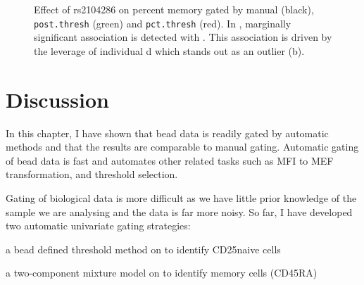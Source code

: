 \begin{figure}[h]
\begin{subfigure}[b]{.5\textwidth}
    \caption{}
\end{subfigure}
{Effect of rs2104286 on percent memory gated by manual (black), \texttt{post.thresh} (green) and \texttt{pct.thresh} (red).}
{
  In , marginally significant association is detected with .
  This association is driven by the leverage of individual d which stands out as an outlier (b).
}
\end{figure}



\clearpage


\section{Discussion}

%
In this chapter, I have shown that bead data is readily gated by automatic methods and that the results are comparable to manual gating.
Automatic gating of bead data is fast and automates other related tasks such as MFI to MEF transformation, and threshold selection.

Gating of biological data is more difficult as we have little prior knowledge of the sample we are analysing and the data is far more noisy.
So far, I have developed two automatic univariate gating strategies:
\begin{itemise}
\item a bead defined threshold method on  to identify CD25\positive naive cells
\item a two-component mixture model on  to identify memory cells (CD45RA\negative)
\end{itemise}

